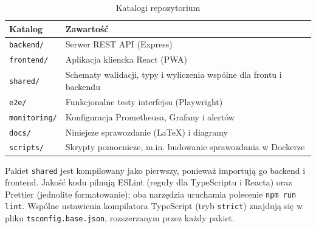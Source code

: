 \begin{table}[htbp]
\centering
\caption{Katalogi repozytorium}
\label{tab:repozytorium}
\small
\begin{tabular}{|p{}|p{}|}
\hline
\textbf{Katalog} & \textbf{Zawartość} \\
\hline
\texttt{backend/} & Serwer REST API (Express) \\
\hline
\texttt{frontend/} & Aplikacja kliencka React (PWA) \\
\hline
\texttt{shared/} & Schematy walidacji, typy i wyliczenia wspólne dla frontu i backendu \\
\hline
\texttt{e2e/} & Funkcjonalne testy interfejsu (Playwright) \\
\hline
\texttt{monitoring/} & Konfiguracja Prometheusa, Grafany i alertów \\
\hline
\texttt{docs/} & Niniejsze sprawozdanie (\LaTeX) i diagramy \\
\hline
\texttt{scripts/} & Skrypty pomocnicze, m.in. budowanie sprawozdania w Dockerze \\
\hline
\end{tabular}
\par
{}
\end{table}

Pakiet \texttt{shared} jest kompilowany jako pierwszy, ponieważ importują go
backend i frontend. Jakość kodu pilnują ESLint (reguły dla TypeScriptu
i Reacta) oraz Prettier (jednolite formatowanie); oba narzędzia uruchamia
polecenie \texttt{npm run lint}. Wspólne ustawienia kompilatora TypeScript
(tryb \texttt{strict}) znajdują się w pliku \texttt{tsconfig.base.json},
rozszerzanym przez każdy pakiet.
